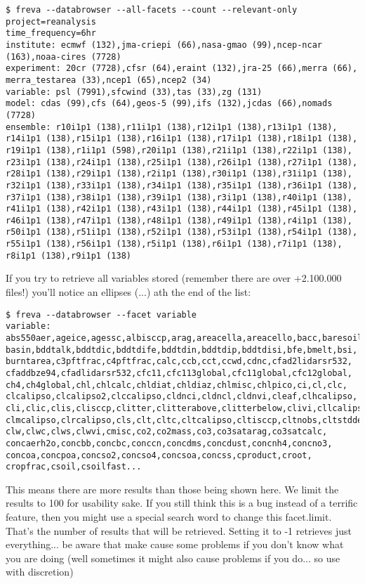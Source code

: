 \documentclass[a4paper,11pt]{ltxdoc}
\begin{document}
\begin{verbatim}
$ freva --databrowser --all-facets --count --relevant-only project=reanalysis 
time_frequency=6hr
institute: ecmwf (132),jma-criepi (66),nasa-gmao (99),ncep-ncar (163),noaa-cires (7728)
experiment: 20cr (7728),cfsr (64),eraint (132),jra-25 (66),merra (66),
merra_testarea (33),ncep1 (65),ncep2 (34)
variable: psl (7991),sfcwind (33),tas (33),zg (131)
model: cdas (99),cfs (64),geos-5 (99),ifs (132),jcdas (66),nomads (7728)
ensemble: r10i1p1 (138),r11i1p1 (138),r12i1p1 (138),r13i1p1 (138),
r14i1p1 (138),r15i1p1 (138),r16i1p1 (138),r17i1p1 (138),r18i1p1 (138),
r19i1p1 (138),r1i1p1 (598),r20i1p1 (138),r21i1p1 (138),r22i1p1 (138),
r23i1p1 (138),r24i1p1 (138),r25i1p1 (138),r26i1p1 (138),r27i1p1 (138),
r28i1p1 (138),r29i1p1 (138),r2i1p1 (138),r30i1p1 (138),r31i1p1 (138),
r32i1p1 (138),r33i1p1 (138),r34i1p1 (138),r35i1p1 (138),r36i1p1 (138),
r37i1p1 (138),r38i1p1 (138),r39i1p1 (138),r3i1p1 (138),r40i1p1 (138),
r41i1p1 (138),r42i1p1 (138),r43i1p1 (138),r44i1p1 (138),r45i1p1 (138),
r46i1p1 (138),r47i1p1 (138),r48i1p1 (138),r49i1p1 (138),r4i1p1 (138),
r50i1p1 (138),r51i1p1 (138),r52i1p1 (138),r53i1p1 (138),r54i1p1 (138),
r55i1p1 (138),r56i1p1 (138),r5i1p1 (138),r6i1p1 (138),r7i1p1 (138),
r8i1p1 (138),r9i1p1 (138)
\end{verbatim}
If you try to retrieve all variables stored (remember there are over +2.100.000 files!) you'll notice an ellipses (...) ath the end of the list:
\begin{verbatim}
$ freva --databrowser --facet variable
variable: abs550aer,ageice,agessc,albisccp,arag,areacella,areacello,bacc,baresoilfrac,
basin,bddtalk,bddtdic,bddtdife,bddtdin,bddtdip,bddtdisi,bfe,bmelt,bsi,
burntarea,c3pftfrac,c4pftfrac,calc,ccb,cct,ccwd,cdnc,cfad2lidarsr532,
cfaddbze94,cfadlidarsr532,cfc11,cfc113global,cfc11global,cfc12global,
ch4,ch4global,chl,chlcalc,chldiat,chldiaz,chlmisc,chlpico,ci,cl,clc,
clcalipso,clcalipso2,clccalipso,cldnci,cldncl,cldnvi,cleaf,clhcalipso,
cli,clic,clis,clisccp,clitter,clitterabove,clitterbelow,clivi,cllcalipso,
clmcalipso,clrcalipso,cls,clt,cltc,cltcalipso,cltisccp,cltnobs,cltstddev,
clw,clwc,clws,clwvi,cmisc,co2,co2mass,co3,co3satarag,co3satcalc,
concaerh2o,concbb,concbc,conccn,concdms,concdust,concnh4,concno3,
concoa,concpoa,concso2,concso4,concsoa,concss,cproduct,croot,
cropfrac,csoil,csoilfast...
\end{verbatim}
This means there are more results than those being shown here. We limit the results to 100 for usability sake. If you still think this is a bug instead of a terrific feature, then you might use a special search word to change this facet.limit. That's the number of results that will be retrieved. Setting it to -1 retrieves just everything... be aware that make cause some problems if you don't know what you are doing (well sometimes it might also cause problems if you do... so use with discretion)
\end{document}
